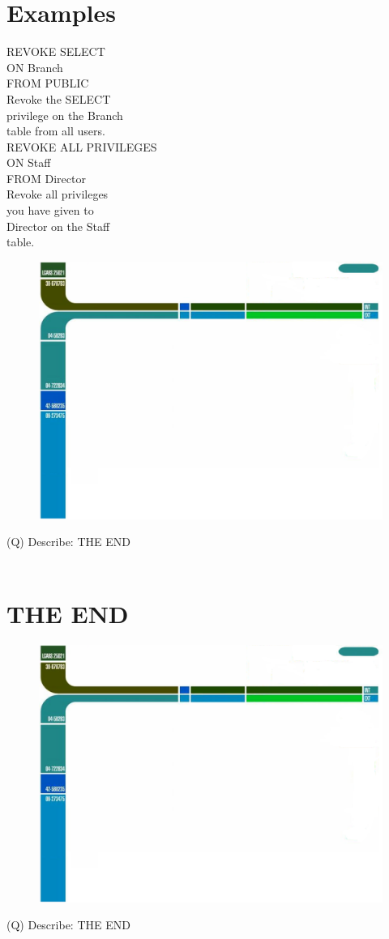 \documentclass[12pt]{article}
\begin{document}
\section{Examples}
REVOKE SELECT\\
ON Branch\\
FROM PUBLIC\\
Revoke the SELECT \\
privilege on the Branch \\
table from all users.\\
REVOKE ALL PRIVILEGES\\
ON Staff\\
FROM Director\\
Revoke all privileges \\
you have given to \\
Director on the Staff \\
table.\\
\begin{figure}[H]
\includegraphics[width=0.5\linewidth]{page25-image-1.png}
\end{figure}
\clearpage
(Q)
Describe: THE END
\\ 
 \\
\section{THE END}
\begin{figure}[H]
\includegraphics[width=0.5\linewidth]{page26-image-1.png}
\end{figure}
\clearpage
(Q)
Describe: THE END
\clearpage
\\ 
\end{document}
